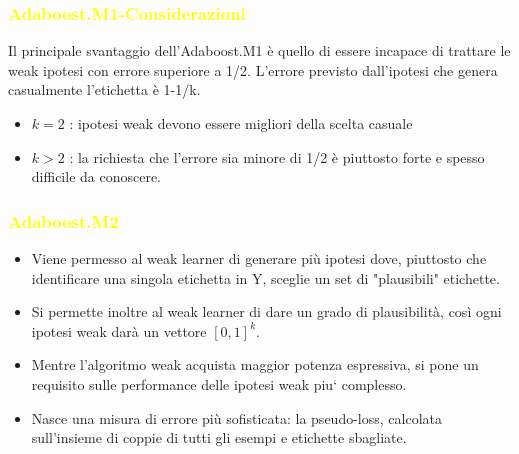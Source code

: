 \documentclass[handout
]{beamer}
\def\yellow#1{{\textcolor{yellow}{#1}}}
\begin{document}
\begin{frame}
\frametitle{\yellow{Adaboost.M1-Considerazioni}}

Il principale svantaggio dell'Adaboost.M1 \`e quello di essere incapace di trattare le weak ipotesi con errore superiore a 1/2. L'errore previsto dall'ipotesi che genera casualmente l'etichetta \`e 1-1/k.
\begin{itemize}
\item \begin{math}k = 2\end{math} : ipotesi weak devono essere migliori della scelta casuale
\item \begin{math}k > 2\end{math} : la richiesta che l'errore sia minore di 1/2 
\`e piuttosto forte e spesso difficile da conoscere.

\end{itemize}
\end{frame}

\begin{frame}
\frametitle{\yellow{Adaboost.M2}}
\begin{itemize}
\item Viene permesso al weak learner di generare pi\`u ipotesi dove, piuttosto che identificare una singola etichetta in Y, sceglie un set di "plausibili" etichette.
\item Si permette inoltre al weak learner di dare un grado di plausibilit\`a, cos\`i ogni ipotesi weak dar\`a un vettore \begin{math} \left[0,1\right]^k \end{math}.
\item Mentre l'algoritmo weak acquista maggior potenza espressiva, si pone un 
requisito sulle performance delle ipotesi weak piu` complesso.
\item Nasce una misura di errore pi\`u sofisticata: la pseudo-loss, calcolata 
sull'insieme di coppie di tutti gli esempi e etichette sbagliate.
\end{itemize}
\end{frame}
\end{document}
